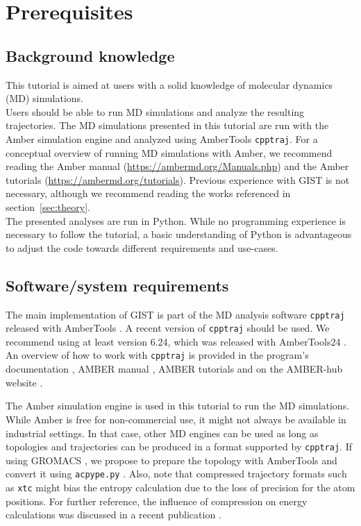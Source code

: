 \documentclass[9pt,tutorial,pubversion]{livecoms}
\newcommand{\software}{\texttt}
\newcommand\inlinecode{\texttt}
\begin{document}
\section{Prerequisites}


\subsection{Background knowledge}
This tutorial is aimed at users with a solid knowledge of molecular dynamics (MD) simulations.\\
Users should be able to run MD simulations and analyze the resulting trajectories. 
The MD simulations presented in this tutorial are run with the Amber simulation engine and analyzed using AmberTools \software{cpptraj}. 
For a conceptual overview of running MD simulations with Amber, we recommend reading the Amber manual (\url{https://ambermd.org/Manuals.php}) \cite{amber24} and the Amber tutorials (\url{https://ambermd.org/tutorials}). 
Previous experience with GIST is not necessary, although we recommend reading the works referenced in section~\ref{sec:theory}.\\
The presented analyses are run in Python.
While no programming experience is necessary to follow the tutorial, a basic understanding of Python is advantageous to adjust the code towards different requirements and use-cases.

\subsection{Software/system requirements}
The main implementation of GIST is part of the MD analysis software \software{cpptraj} released with AmberTools \cite{amber24, Case2023-ambertools}.
A recent version of \software{cpptraj} should be used. 
We recommend using at least version 6.24, which was released with AmberTools24 \cite{Case2023-ambertools}. 
An overview of how to work with \software{cpptraj} is provided in the program's documentation \cite{cpptraj_doc}, AMBER manual \cite{amber24}, AMBER tutorials \cite{amber_tut_cpptraj} and on the AMBER-hub website \cite{amber_hub}.

The Amber simulation engine is used in this tutorial to run the MD simulations.
While Amber is free for non-commercial use, it might not always be available in industrial settings.
In that case, other MD engines can be used as long as topologies and trajectories can be produced in a format supported by \software{cpptraj}.
If using GROMACS \cite{Abraham2015-gromacs,Pronk2013-gromacs}, we propose to prepare the topology with AmberTools \cite{Case2023-ambertools} and convert it using \software{acpype.py} \cite{Sousa_da_Silva2012-acpype}.
Also, note that compressed trajectory formats such as \inlinecode{xtc} might bias the entropy calculation due to the loss of precision for the atom positions. 
For further reference, the influence of compression on energy calculations was discussed in a recent publication \cite{Roe2022-compression}.
\end{document}
